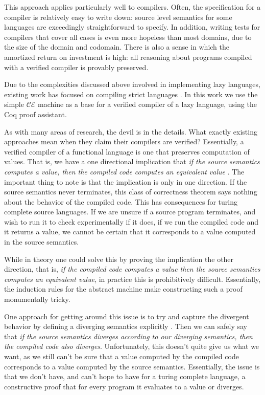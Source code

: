 This approach applies particularly well to compilers. Often, the specification
for a compiler is relatively easy to write down: source level semantics for some
languages are exceedingly straightforward to specify. In addition, writing tests 
for compilers that cover all cases is even more hopeless than most domains, due
to the size of the domain and codomain. There is also a sense in which the
amortized return on investment is high: all reasoning about programs compiled
with a verified compiler is provably preserved. 

Due to the complexities discussed above involved in implementing lazy languages,
existing work has focused on compiling strict languages
\cite{chlipala2007certified, leroy2012compcert, cakeml14}. In this work we use
the simple $\mathcal{CE}$ machine as a base for a verified compiler of a lazy
language, using the Coq proof assistant. 

As with many areas of research, the devil is in the details. What exactly
existing approaches mean when they claim their compilers are verified?
Essentially, a verified compiler of a functional language is one that preserves
computation of values. That is, we have a one directional implication that
\emph{if the source semantics computes a value, then the compiled code computes
an equivalent value} \cite{chlipala2007certified}. The important thing to note is that the
implication is only in one direction. If the source semantics never terminates,
this class of correctness theorem says nothing about the behavior of the
compiled code. This has consequences for turing complete source languages. If we
are unsure if a source program terminates, and wish to run it to check
experimentally if it does, if we run the compiled code and it returns a value,
we cannot be certain that it corresponds to a value computed in the source
semantics. 

While in theory one could solve this by proving the implication the other
direction, that is, \emph{if the compiled code computes a value then the source
semantics computes an equivalent value}, in practice this is prohibitively
difficult. Essentially, the induction rules for the abstract machine make
constructing such a proof monumentally tricky. 

One approach for getting around this issue is to try and capture the divergent
behavior by defining a diverging semantics explicitly \cite{functionalbigstep}.
Then we can safely say that \emph{if the source semantics diverges according to
our diverging semantics, then the compiled code also diverges}. Unfortunately,
this doesn't quite give us what we want, as we still can't be sure that a value
computed by the compiled code corresponds to a value computed by the source
semantics. Essentially, the issue is that we don't have, and can't hope to have
for a turing complete language, a constructive proof that for every program it
evaluates to a value or diverges.  

